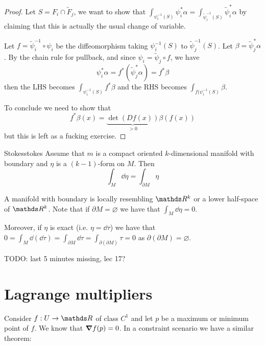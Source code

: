 \documentclass[12pt]{extarticle}
\begin{document}
\begin{proof}
	Let $S = F_i \cap \tilde F_j$, we want to show that
	$\int_{\psi_i^{-1}(S)} \psi^*_i \alpha = \int_{\tilde \psi_i^{-1}(S)} \tilde \psi^*_i \alpha$ by
	claiming that this is actually the usual change of variable.

	Let $f = \tilde \psi_i^{-1} \circ \psi_i$ be the diffeomorphism taking $\psi_i^{-1}(S)$ to
	$\tilde \psi_j^{-1}(S)$. Let $\beta = \tilde \psi_j^* \alpha$.
	By the chain rule for pullback, and since $\psi_i = \tilde \psi_j \circ f$, we have
	\begin{equation}
		\psi_i^* \alpha = f^* (\tilde \psi_j^* \alpha) = f^* \beta
	\end{equation}
	then the LHS becomes $\int_{\psi_i^{-1}(S)} f^* \beta$ and the RHS becomes
	$\int_{f(\psi_i^{-1}(S)} \beta$.

	To conclude we need to show that
	\begin{equation}
		f^* \beta (x) = \underbrace{\det (Df(x))}_{>0} \beta(f(x))
	\end{equation}
	but this is left as a fucking exercise.
\end{proof}

\begin{theorem}{Stokes}{stokes}
	Assume that $m$ is a compact oriented $k$-dimensional manifold with boundary and $\eta$ is a
	$(k-1)$-form on $M$.
	Then
	\begin{equation}
		\int_{M} \dd \eta = \int_{\partial M} \eta
	\end{equation}
\end{theorem}

A manifold with boundary is locally resembling $\R^k$ or a lower half-space of $\R^k$.
Note that if $\partial M = \varnothing$ we have that $\int_M \dd \eta = 0$.

Moreover, if $\eta$ is exact (i.e. $\eta = \dd \tau$) we have that
$0 = \int_M \dd(\dd \tau) = \int_{\partial M} \dd \tau = \int_{\partial(\partial M)} \tau = 0$ as
$\partial(\partial M) = \varnothing$.

TODO: last 5 minutes missing, lec 17?

\section{Lagrange multipliers}

Consider $f: U \to \R$ of class $C^1$ and let $p$ be a maximum or minimum point of $f$. We know that
$\grad f(p) = 0$.
In a constraint scenario we have a similar theorem:
\end{document}
